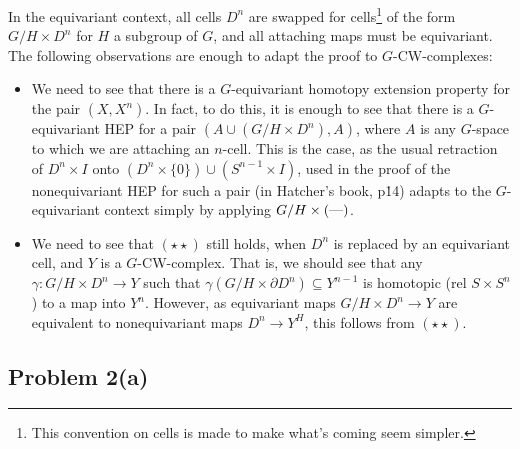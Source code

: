 \documentclass[11pt]{article}
\begin{document}
In the equivariant context, all cells $D^n$ are swapped for cells\footnote{This convention on cells is made to make what's coming seem simpler.} of the form $G/H\times D^n$ for $H$ a subgroup of $G$, and all attaching maps must be equivariant. The following observations are enough to adapt the proof to $G$-CW-complexes:
\begin{itemize}\squishlist
\item We need to see that there is a $G$-equivariant homotopy extension property for the pair $(X,X^n)$. In fact, to do this, it is enough to see that there is a $G$-equivariant HEP for a pair $(A\cup (G/H\times D^n),A)$, where $A$ is any $G$-space to which we are attaching an $n$-cell. This is the case, as the usual retraction of $D^n\times I$ onto $(D^n\times\{0\})\cup(S^{n-1}\times I)$, used in the proof of the nonequivariant HEP for such a pair (in Hatcher's book, p\. 14) adapts to the $G$-equivariant context simply by applying $G/H\times(\textup{---})$.
\item We need to see that $(\star\star)$ still holds, when $D^n$ is replaced by an equivariant cell, and $Y$ is a $G$-CW-complex. That is, we should see that any $\gamma:G/H\times D^n\to Y$ such that $\gamma(G/H\times\partial D^n)\subseteq Y^{n-1}$ is homotopic (rel $S\times S^n$) to a map into $Y^n$. However, as equivariant maps $G/H\times D^n\to Y$ are equivalent to nonequivariant maps $D^n\to Y^H$, this follows from $(\star\star)$.
\end{itemize}
\subsection*{Problem 2(a)}
\end{document}

